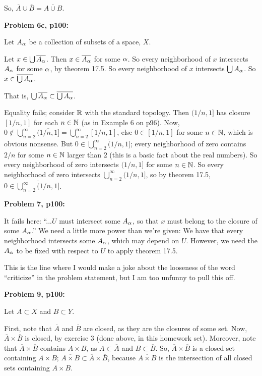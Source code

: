 \documentclass[a4paper,12pt]{article}
\begin{document}
So, $\overline{A} \cup \overline{B} = \overline{A \cup B}$. 

\shunt

{\bf Problem 6c, p100:}

Let $A_\alpha$ be a collection of subsets of a space, $X$.

Let $x \in \bigcup \overline{A_\alpha}$. Then $x \in \overline{A_\alpha}$ for some $\alpha$. So every neighborhood of $x$ intersects $A_\alpha$ for some $\alpha$, by theorem 17.5. So every neighborhood of $x$ intersects $\bigcup A_\alpha$. So $x \in \overline{\bigcup A_\alpha}$. 

That is, $\bigcup \overline{A_\alpha} \subset \overline{\bigcup A_\alpha}$.

Equality fails; consider $\mathbb{R}$ with the standard topology. Then $(1/n,1]$ has closure $[1/n,1]$ for each $n \in \mathbb{N}$ (as in Example 6 on p96). Now, $0 \notin \bigcup\limits_{n=2}^\infty \overline{(1/n,1]} = \bigcup\limits_{n=2}^\infty [1/n,1]$, else $0 \in [1/n,1]$ for some $n \in \mathbb{N}$, which is obvious nonsense. But $0 \in \overline{\bigcup\limits_{n=2}^\infty (1/n,1]}$; every neighborhood of zero contains $2/n$ for some $n \in \mathbb{N}$ larger than $2$ (this is a basic fact about the real numbers). So every neighborhood of zero intersects $(1/n,1]$ for some $n \in \mathbb{N}$. So every neighborhood of zero intersects $\bigcup\limits_{n=2}^\infty (1/n,1]$, so by theorem 17.5, $0 \in \overline{\bigcup\limits_{n=2}^\infty (1/n,1]}$.

\shunt

{\bf Problem 7, p100:}

It fails here: ``...$U$ must intersect some $A_\alpha$, so that $x$ must belong to the closure of some $A_\alpha$.'' We need a little more power than we're given: We have that every neighborhood intersects some $A_\alpha$, which may depend on $U$. However, we need the $A_\alpha$ to be fixed with respect to $U$ to apply theorem 17.5.

This is the line where I would make a joke about the looseness of the word ``criticize'' in the problem statement, but I am too unfunny to pull this off.

\shunt

{\bf Problem 9, p100:}

Let $A \subset X$ and $B \subset Y$.

First, note that $\overline{A}$ and $\overline{B}$ are closed, as they are the closures of some set. Now, $\overline{A} \times \overline{B}$ is closed, by exercise 3 (done above, in this homework set). Moreover, note that $\overline{A} \times \overline{B}$ contains $A \times B$, as $A \subset \overline{A}$ and $B\subset \overline{B}$. So, $\overline{A} \times \overline{B}$ is a closed set containing $A \times B$; $\overline{A \times B} \subset \overline{A} \times \overline{B}$, because $\overline{A \times B}$ is the intersection of all closed sets containing $A \times B$.
\end{document}
